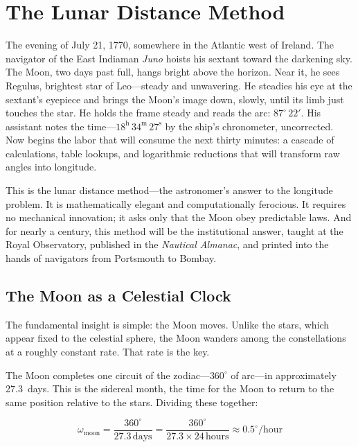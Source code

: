 \chapter{The Lunar Distance Method}
\label{ch:lunar-distance}

The evening of July 21, 1770, somewhere in the Atlantic west of Ireland. The navigator of the East Indiaman \textit{Juno} hoists his sextant toward the darkening sky. The Moon, two days past full, hangs bright above the horizon. Near it, he sees Regulus, brightest star of Leo—steady and unwavering. He steadies his eye at the sextant's eyepiece and brings the Moon's image down, slowly, until its limb just touches the star. He holds the frame steady and reads the arc: $87^{\circ}\,22'$. His assistant notes the time—$18^{\mathrm{h}}\,34^{\mathrm{m}}\,27^{\mathrm{s}}$ by the ship's chronometer, uncorrected. Now begins the labor that will consume the next thirty minutes: a cascade of calculations, table lookups, and logarithmic reductions that will transform raw angles into longitude.

This is the lunar distance method---the astronomer's answer to the longitude problem. It is mathematically elegant and computationally ferocious. It requires no mechanical innovation; it asks only that the Moon obey predictable laws. And for nearly a century, this method will be the institutional answer, taught at the Royal Observatory, published in the \textit{Nautical Almanac}, and printed into the hands of navigators from Portsmouth to Bombay.

\section{The Moon as a Celestial Clock}

The fundamental insight is simple: the Moon moves. Unlike the stars, which appear fixed to the celestial sphere, the Moon wanders among the constellations at a roughly constant rate. That rate is the key.

The Moon completes one circuit of the zodiac—$360^{\circ}$ of arc—in approximately \SI{27.3}{days}. This is the sidereal month, the time for the Moon to return to the same position relative to the stars. Dividing these together:

\begin{equation}
\omega_{\text{moon}} = \frac{360^{\circ}}{27.3\,\text{days}} = \frac{360^{\circ}}{27.3 \times 24\,\text{hours}} \approx 0.5^{\circ}/\text{hour}
\end{equation}


